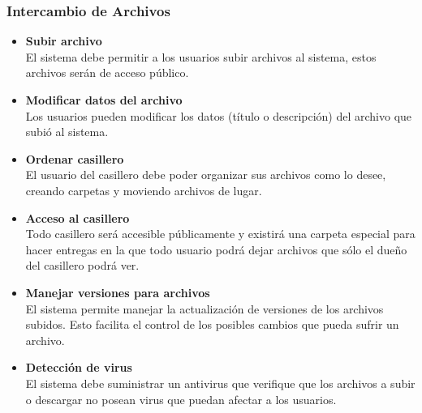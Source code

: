 \subsubsection{Intercambio de Archivos}
\begin{itemize}
	\item \textbf{Subir archivo}\\
	El sistema debe permitir a los usuarios subir archivos al sistema, estos archivos serán de acceso público.
	\item \textbf{Modificar datos del archivo}\\
	Los usuarios pueden modificar los datos (título o descripción) del archivo que subió al sistema.
	\item \textbf{Ordenar casillero}\\
	El usuario del casillero debe poder organizar sus archivos como lo desee, creando carpetas y moviendo archivos de lugar.
	\item \textbf{Acceso al casillero}\\
	Todo casillero será accesible públicamente y existirá una carpeta especial para hacer entregas en la que todo usuario podrá dejar archivos que sólo el dueño del casillero podrá ver.
	\item \textbf{Manejar versiones para archivos}\\
	El sistema permite manejar la actualización de versiones de los archivos subidos. Esto facilita el control de los posibles cambios que pueda sufrir un archivo.
	\item \textbf{Detección de virus}\\
	El sistema debe suministrar un antivirus que verifique que los archivos a subir o descargar no posean virus que puedan afectar a los usuarios.
\end{itemize}

